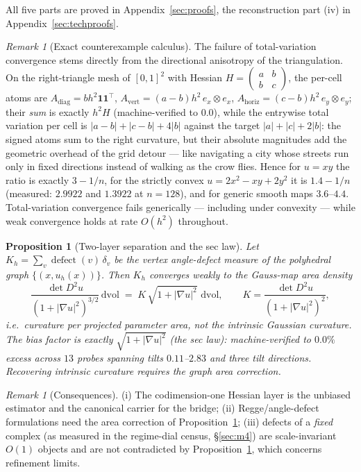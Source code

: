 \documentclass[11pt,a4paper]{article}
\theoremstyle{plain}
\newtheorem{proposition}[theorem]{Proposition}
\theoremstyle{definition}
\theoremstyle{remark}
\newtheorem{remark}[theorem]{Remark}
\newcommand{\dvol}{\,\mathrm{dvol}}
\begin{document}
All five parts are proved in Appendix~\ref{sec:proofs}, the
reconstruction part (iv) in Appendix~\ref{sec:techproofs}.

\begin{remark}[Exact counterexample calculus]\label{rem:tvcounter}
The failure of total-variation convergence stems directly from the
directional anisotropy of the triangulation. On the right-triangle mesh of $[0,1]^2$ with Hessian
$H = \left(\begin{smallmatrix} a & b\\ b & c\end{smallmatrix}\right)$, the
per-cell atoms are $A_{\mathrm{diag}} = b h^2 \mathbf{1}\mathbf{1}^\top$,
$A_{\mathrm{vert}} = (a-b) h^2\, e_x \otimes e_x$,
$A_{\mathrm{horiz}} = (c-b) h^2\, e_y \otimes e_y$; their \emph{sum} is
exactly $h^2 H$ (machine-verified to $0.0$), while the entrywise total
variation per cell is $|a-b| + |c-b| + 4|b|$ against the target
$|a| + |c| + 2|b|$: the signed atoms sum to the right curvature, but
their absolute magnitudes add the geometric overhead of the grid
detour --- like navigating a city whose streets run only in fixed
directions instead of walking as the crow flies. Hence for $u = xy$ the ratio is exactly $3 - 1/n$, for
the strictly convex $u = 2x^2 - xy + 2y^2$ it is $1.4 - 1/n$ (measured:
$2.9922$ and $1.3922$ at $n=128$), and for generic smooth maps $3.6$--$4.4$.
Total-variation convergence fails generically --- including under
convexity --- while weak convergence holds at rate $O(h^2)$ throughout.
\end{remark}

\begin{proposition}[Two-layer separation and the sec law]
\label{prop:seclaw}
Let $K_h = \sum_v \operatorname{defect}(v)\,\delta_v$ be the vertex
angle-defect measure of the polyhedral graph
$\{(x, u_h(x))\}$. Then $K_h$ converges weakly to the \emph{Gauss-map area
density}
\[
\frac{\det D^2 u}{\left(1 + |\nabla u|^2\right)^{3/2}} \dvol
\;=\; K\,\sqrt{1+|\nabla u|^2}\,\dvol,
\qquad
K = \frac{\det D^2 u}{(1+|\nabla u|^2)^2},
\]
i.e.\ curvature per projected parameter area, \emph{not} the intrinsic
Gaussian curvature. The bias factor is exactly
$\sqrt{1+|\nabla u|^2}$ (the sec law): machine-verified to $0.0\%$ excess
across $13$ probes spanning tilts $0.11$--$2.83$ and three tilt
directions. Recovering intrinsic curvature requires the graph area
correction.
\end{proposition}

\begin{remark}[Consequences]
(i) The codimension-one Hessian layer is the unbiased estimator and the
canonical carrier for the bridge; (ii) Regge/angle-defect formulations
need the area correction of Proposition~\ref{prop:seclaw}; (iii) defects
of a \emph{fixed} complex (as measured in the regime-dial census, \S\ref{sec:m4}) are
scale-invariant $O(1)$ objects and are not contradicted by
Proposition~\ref{prop:seclaw}, which concerns refinement limits.
\end{remark}
\end{document}

